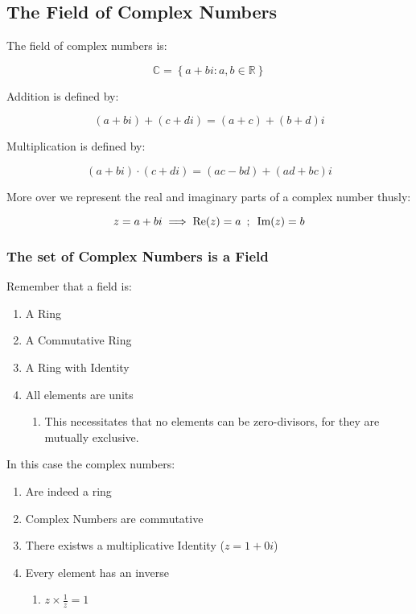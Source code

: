 \documentclass[
]{article}
\begin{document}
\hypertarget{header-n914}{%
\subsection{The Field of Complex Numbers}\label{header-n914}}

The field of complex numbers is:

\[\mathbb{C} = \left \{ a + b i : a, b \in \mathbb{R} \right \}\]

Addition is defined by:

\[(a+bi) + (c+di) = (a+c) + (b+d)i\]

Multiplication is defined by:

\[(a+bi)\cdot (c + di) = (ac-bd) + (ad+bc)i\]

More over we represent the real and imaginary parts of a complex number
thusly:

\[z = a + bi \\
\implies \text{Re}(z) = a \enspace ; \enspace \text{Im}(z) =b\]

\hypertarget{header-n924}{%
\subsubsection{The set of Complex Numbers is a
Field}\label{header-n924}}

Remember that a field is:

\begin{enumerate}
\def\labelenumi{\arabic{enumi}.}
\item
  A Ring
\item
  A Commutative Ring
\item
  A Ring with Identity
\item
  All elements are units

  \begin{enumerate}
  \def\labelenumii{\arabic{enumii}.}
  \item
    This necessitates that no elements can be zero-divisors, for they
    are mutually exclusive.
  \end{enumerate}
\end{enumerate}

In this case the complex numbers:

\begin{enumerate}
\def\labelenumi{\arabic{enumi}.}
\item
  Are indeed a ring
\item
  Complex Numbers are commutative
\item
  There existws a multiplicative Identity (\(z = 1 + 0i\))
\item
  Every element has an inverse

  \begin{enumerate}
  \def\labelenumii{\arabic{enumii}.}
  \item
    \(z \times \frac{1}{z} = 1\)
  \end{enumerate}
\end{enumerate}
\end{document}
